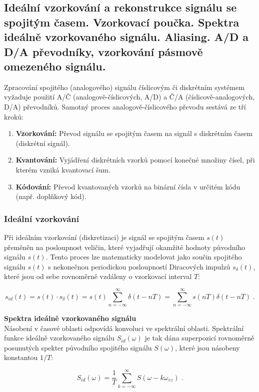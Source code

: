 \subsection{Ideální vzorkování a rekonstrukce signálu se spojitým časem. Vzorkovací poučka. Spektra ideálně vzorkovaného signálu. Aliasing. A/D a D/A převodníky, vzorkování pásmově omezeného signálu.}
    Zpracování spojitého (analogového) signálu číslicovým či diskrétním systémem vyžaduje použití A/Č (analogově-číslicových, A/D) a Č/A (číslicově-analogových, D/A) převodníků. Samotný proces analogově-číslicového převodu sestává ze tří kroků:
    \begin{enumerate}
        \item \textbf{Vzorkování:} Převod signálu se spojitým časem na signál s diskrétním časem (diskrétní signál).
        \item \textbf{Kvantování:} Vyjádření diskrétních vzorků pomocí konečné množiny čísel, při kterém vzniká kvantovací šum.
        \item \textbf{Kódování:} Převod kvantovaných vzorků na binární čísla v určitém kódu (např. doplňkový kód).
    \end{enumerate}
    \subsubsection{Ideální vzorkování} 
        Při ideálním vzorkování (diskretizaci) je signál se spojitým časem $s(t)$ přeměněn na posloupnost veličin, které vyjadřují okamžité hodnoty původního signálu $s(t)$. Tento proces lze matematicky modelovat jako součin spojitého signálu $s(t)$ s nekonečnou periodickou posloupností Diracových impulzů $s_{\delta}(t)$, které jsou od sebe rovnoměrně vzdáleny o vzorkovací interval $T$:

        \begin{equation*}
        s_{id}(t) = s(t) \cdot s_{\delta}(t) = s(t) \sum_{n=-\infty}^{\infty} \delta(t - nT) = \sum_{n=-\infty}^{\infty} s(nT)\delta(t - nT) \;.
        \end{equation*}
        
        \textbf{Spektra ideálně vzorkovaného signálu}\\
        Násobení v časové oblasti odpovídá konvoluci ve spektrální oblasti. Spektrální funkce ideálně vzorkovaného signálu $S_{id}(\omega)$ je tak dána superpozicí rovnoměrně posunutých spekter původního spojitého signálu $S(\omega)$, které jsou násobeny konstantou $1/T$:
        
        \begin{equation*}
        S_{id}(\omega) = \frac{1}{T} \sum_{k=-\infty}^{\infty} S(\omega - k\omega_{vz}) \;.
        \end{equation*}
        
